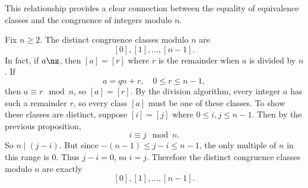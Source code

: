 This relationship provides a clear connection between the equality of equivalence classes and the congruence of integers modulo $n$.

\begin{proposition}{
    Fix $n\geq 2$.
    The distinct congruence classes modulo $n$ are
    \[
        [0],[1],\hdots,[n-1].
    \]
    In fact, if $a\nz$, then $[a]=[r]$ where $r$ is the remainder when $a$ is divided by $n$.
}
    If
    \[
        a = qn + r,\quad 0\leq r\leq n-1,
    \]
    then $a\equiv r\mod n$, so $[a]=[r]$.
    By the division algorithm, every integer $a$ has such a remainder $r$, so every class $[a]$ must be one of these classes.
    To show these classes are distinct, suppose $[i]=[j]$ where $0\leq i,j\leq n-1$.
    Then by the previous proposition,
    \[
        i\equiv j\mod n.
    \]
    So $n\mid (j-i)$.
    But since $-(n-1)\leq j-i\leq n-1$, the only multiple of $n$ in this range is $0$.
    Thus $j-i=0$, so $i=j$.
    Therefore the distinct congruence classes modulo $n$ are exactly
    \[
        [0],[1],\hdots,[n-1].
    \]
\end{proposition}